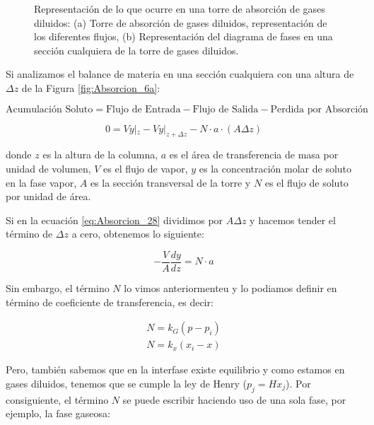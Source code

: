 \documentclass[11pt]{book}
\begin{document}
\begin{figure}[H]
\begin{subfigure}[b]{0.45\textwidth}
    \caption{ }
    \label{fig:Absorcion_6b}
  \end{subfigure}
  \caption{Representación de lo que ocurre en una torre de absorción de gases diluidos: (a) Torre de absorción de gases diluidos, representación de los diferentes flujos, (b) Representación del diagrama de fases en una sección cualquiera de la torre de gases diluidos.}
\end{figure}

Si analizamos el balance de materia en una sección cualquiera con una altura de $\Delta z$ de la Figura \ref{fig:Absorcion_6a}:

\begin{equation*}
    \textrm{Acumulación Soluto} = \textrm{Flujo de Entrada} - \textrm{Flujo de Salida} - \textrm{Perdida por Absorción}
\end{equation*}

\begin{equation}
    \label{eq:Absorcion_28}
    0 = V y|_z - V y|_{z+\Delta z} - N \cdot a \cdot (A\Delta z)
\end{equation}

donde $z$ es la altura de la columna, $a$ es el área de transferencia de masa por unidad de volumen, $V$ es el flujo de vapor, $y$ es la concentración molar de soluto en la fase vapor, $A$ es la sección transversal de la torre y $N$ es el flujo de soluto por unidad de área.

Si en la ecuación \ref{eq:Absorcion_28} dividimos por $A\Delta z$ y hacemos tender el término de $\Delta z$ a cero, obtenemos lo siguiente:

\begin{equation}
    \label{eq:Absorcion_29}
    -\frac{V}{A} \frac{dy}{dz} = N \cdot a
\end{equation}

Sin embargo, el término $N$ lo vimos anteriormenteu y lo podiamos definir en término de coeficiente de transferencia, es decir:

\begin{align}
    \label{eq:Absorcion_30}
    N = k_G (p - p_i) \\
    N = k_x (x_i - x)
\end{align}

Pero, también sabemos que en la interfase existe equilibrio y como estamos en gases diluidos, tenemos que se cumple la ley de Henry ($p_j = H x_j$). Por consiguiente, el término $N$ se puede escribir haciendo uso de una sola fase, por ejemplo, la fase gaseosa:
\end{document}
